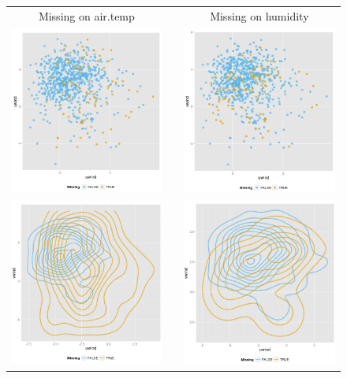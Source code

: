 \documentclass[article]{jss}
\begin{document}
\begin{center}
\begin{figure}[h]
\begin{centering}
\begin{tabular}{ccc}
{\tiny{Missing on air.temp}} && {\tiny{Missing on humidity}}\tabularnewline
\includegraphics[width=.35\textwidth]{graph/fig11-1-air-temp} && \includegraphics[width=.35\textwidth]{graph/fig11-3-humidity}\tabularnewline
\includegraphics[width=.35\textwidth]{graph/fig11-2-air-temp} && \includegraphics[width=.35\textwidth]{graph/fig11-4-humidity}\tabularnewline

\end{tabular}
\end{centering}
\end{figure}
\end{center}
\end{document}
